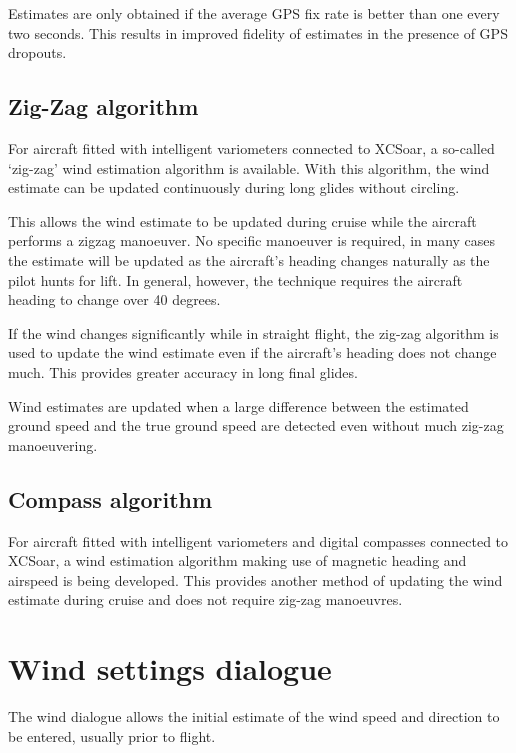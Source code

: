 Estimates are only obtained if the average GPS fix rate is better than
one every two seconds.  This results in improved fidelity of estimates
in the presence of GPS dropouts.


\subsection*{Zig-Zag algorithm}

For aircraft fitted with intelligent variometers connected to XCSoar,
a so-called `zig-zag' wind estimation algorithm is available.  With
this algorithm, the wind estimate can be updated continuously during
long glides without circling.

This allows the wind estimate to be updated during cruise while the
aircraft performs a zigzag manoeuver.  No specific manoeuver is
required, in many cases the estimate will be updated as the aircraft's
heading changes naturally as the pilot hunts for lift.  In general,
however, the technique requires the aircraft heading to change over 40
degrees.

If the wind changes significantly while in straight flight, the
zig-zag algorithm is used to update the wind estimate even if the
aircraft's heading does not change much. This provides greater
accuracy in long final glides.

Wind estimates are updated when a large difference between the
estimated ground speed and the true ground speed are detected even
without much zig-zag manoeuvering.

\subsection*{Compass algorithm}

For aircraft fitted with intelligent variometers and digital compasses
connected to XCSoar, a wind estimation algorithm making use of
magnetic heading and airspeed is being developed.  This provides
another method of updating the wind estimate during cruise and does
not require zig-zag manoeuvres.

\section{Wind settings dialogue}\label{sec:wind-setup}

The wind dialogue allows the initial estimate of the wind speed and
direction to be entered, usually prior to flight.

